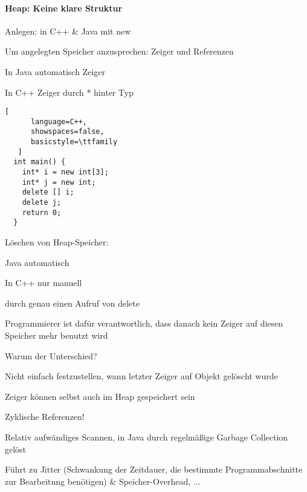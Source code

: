 \documentclass[10pt]{article}
\begin{document}
\begin{itemize*}
\paragraph{Heap: Keine klare Struktur}
\begin{itemize*}
  \item Anlegen: in C++ \& Java mit new
  \item Um angelegten Speicher anzusprechen: Zeiger und Referenzen
  \begin{itemize*}
    \item In Java automatisch Zeiger
    \item In C++ Zeiger durch * hinter Typ
    \begin{lstlisting}[
      language=C++,
      showspaces=false,
      basicstyle=\ttfamily
   ]
  int main() {
    int* i = new int[3];
    int* j = new int;
    delete [] i;
    delete j;
    return 0;
  }
  \end{lstlisting}
  \end{itemize*}
  
  \item Löschen von Heap-Speicher:
  \begin{itemize*}
    \item Java automatisch
    \item In C++ nur manuell
    \begin{itemize*}
      \item durch genau einen Aufruf von delete
      \item Programmierer ist dafür verantwortlich, dass danach kein Zeiger auf diesen Speicher mehr benutzt wird
    \end{itemize*}
  \end{itemize*}
  \item Warum der Unterschied?
  \begin{itemize*}
    \item Nicht einfach festzustellen, wann letzter Zeiger auf Objekt gelöscht wurde
    \begin{itemize*}
      \item Zeiger können selbst auch im Heap gespeichert sein
      \item Zyklische Referenzen!
    \end{itemize*}
    \item Relativ aufwändiges Scannen, in Java durch regelmäßige Garbage Collection gelöst
    \begin{itemize*}
      \item Führt zu Jitter (Schwankung der Zeitdauer, die bestimmte Programmabschnitte zur Bearbeitung benötigen) \& Speicher-Overhead, ...
    \end{itemize*}
  \end{itemize*}
\end{itemize*}


\end{itemize*}
\end{document}

